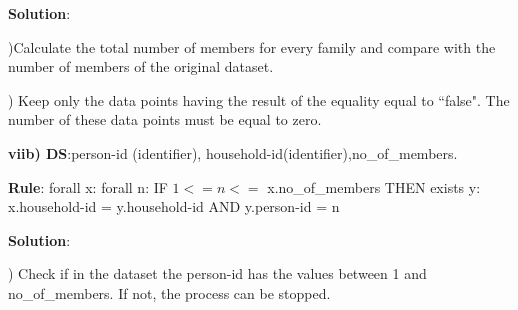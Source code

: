 \bigskip\noindent
\textbf{Solution}:

)Calculate the total number of members for every family and compare with the number of members of the original dataset.

) Keep only the data points having the result of the equality equal to ``false". The number of these data points must be equal to zero.


\begin{table}
\begin{center}
\footnotesize
{}
\caption{Translation of example viia)}
\centering
\label{Tab1-9}
\end{center}
\end{table}



\bigskip\noindent
\textbf{viib) DS}:person-id (identifier), household-id(identifier),no\_of\_members. 


\bigskip\noindent
\textbf{Rule}: forall x: forall n: IF $1 <= n <=$ x.no\_of\_members THEN exists y: x.household-id = y.household-id AND y.person-id = n

\bigskip\noindent
\textbf{Solution}:

) Check if in the dataset the person-id has the values between 1 and no\_of\_members. If not, the process can be stopped.

